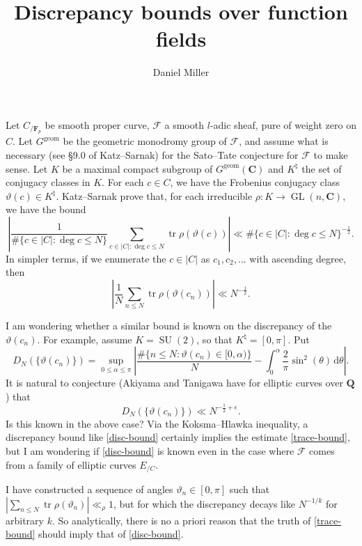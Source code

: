 \documentclass{article}
\title{Discrepancy bounds over function fields}
\author{Daniel Miller}
\DeclareMathOperator{\GL}{GL}
\DeclareMathOperator{\SU}{SU}
\DeclareMathOperator{\tr}{tr}
\newcommand{\bC}{\mathbf{C}}
\newcommand{\bF}{\mathbf{F}}
\newcommand{\bQ}{\mathbf{Q}}
\newcommand{\cF}{\mathcal{F}}
\begin{document}
\maketitle





Let $C_{/\bF_p}$ be smooth proper curve, $\cF$ a smooth $l$-adic sheaf, pure of 
weight zero on $C$. Let $G^\mathrm{geom}$ be the geometric monodromy group of 
$\cF$, and assume what is necessary (see \S9.0 of Katz--Sarnak) for the 
Sato--Tate conjecture for $\cF$ to make sense. Let $K$ be a maximal compact subgroup 
of $G^\mathrm{geom}(\bC)$ and $K^\natural$ the set of conjugacy classes in $K$. 
For each $c\in C$, we have the Frobenius conjugacy class 
$\vartheta(c)\in K^\natural$. Katz--Sarnak prove that, for each irreducible 
$\rho\colon K\to \GL(n,\bC)$, we have the bound
\[
	\left| \frac{1}{\#\{c\in |C|:\deg c\leqslant N\}} \sum_{c\in |C|:\deg c\leqslant N} \tr \rho(\vartheta(c))\right| \ll \#\{c\in |C|:\deg c\leqslant N\}^{-\frac 1 2} .
\]
In simpler terms, if we enumerate the $c\in |C|$ as $c_1,c_2,\dots$ with ascending 
degree, then 
\begin{equation}\label{trace-bound}
	\left| \frac{1}{N} \sum_{n\leqslant N} \tr \rho(\vartheta(c_n))\right| \ll N^{-\frac 1 2} .
\end{equation}

I am wondering whether a similar bound is known on the discrepancy of the $\vartheta(c_n)$. 
For example, assume $K=\SU(2)$, so that $K^\natural=[0,\pi]$. Put 
\[
	D_N(\{\vartheta(c_n)\}) = \sup_{0\leqslant \alpha\leqslant \pi} \left| \frac{\#\{n\leqslant N : \vartheta(c_n)\in [0,\alpha)\}}{N} - \int_0^\alpha \frac{2}{\pi} \sin^2(\theta)\, \mathrm{d}\theta\right| .
\]
It is natural to conjecture (Akiyama and Tanigawa have for elliptic curves over 
$\bQ$) that 
\begin{equation}\label{disc-bound}
	D_N(\{\vartheta(c_n)\}) \ll N^{-\frac 1 2+\epsilon} .
\end{equation}
Is this known in the above case? Via the Koksma--Hlawka inequality, a discrepancy 
bound like \eqref{disc-bound} certainly implies the estimate \eqref{trace-bound}, 
but I am wondering if \eqref{disc-bound} is known even in the case where $\cF$ comes 
from a family of elliptic curves $E_{/C}$. 

I have constructed a sequence of angles $\vartheta_n\in [0,\pi]$ such that 
$|\sum_{n\leqslant N} \tr \rho(\vartheta_n)| \ll_\rho 1$, but for which 
the discrepancy decays like $N^{-1/k}$ for arbitrary $k$. So analytically, there is 
no a priori reason that the truth of \eqref{trace-bound} should imply that of 
\eqref{disc-bound}. 
\end{document}
